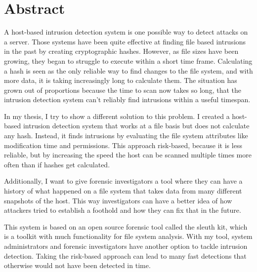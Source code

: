 \chapter*{Abstract}
\label{chap:abstract}

A host-based intrusion detection system is one possible way to detect attacks on a server. Those systems have been quite effective at finding file based intrusions in the past by creating cryptographic hashes. However, as file sizes have been growing, they began to struggle to execute within a short time frame. Calculating a hash is seen as the only reliable way to find changes to the file system, and with more data, it is taking increasingly long to calculate them. The situation has grown out of proportions because the time to scan now takes so long, that the intrusion detection system can't reliably find intrusions within a useful timespan.

In my thesis, I try to show a different solution to this problem. I created a host-based intrusion detection system that works at a file basis but does not calculate any hash. Instead, it finds intrusions by evaluating the file system attributes like modification time and permissions. This approach risk-based, because it is less reliable, but by increasing the speed the host can be scanned multiple times more often than if hashes get calculated.

Additionally, I want to give forensic investigators a tool where they can have a history of what happened on a file system that takes data from many different snapshots of the host. This way investigators can have a better idea of how attackers tried to establish a foothold and how they can fix that in the future.

This system is based on an open source forensic tool called the sleuth kit, which is a toolkit with much functionality for file system analysis. With my tool, system administrators and forensic investigators have another option to tackle intrusion detection. Taking the risk-based approach can lead to many fast detections that otherwise would not have been detected in time.

